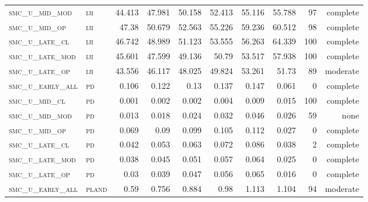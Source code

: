 \begin{landscape}
\begin{center}
\begin{footnotesize}
\begin{longtable}{llrrrrr|rrr}
\textsc{smc\_u\_mid\_mod  } & \textsc{iji       }   & 44.413   & 47.981   & 50.158   & 52.413   & 55.116   & 55.788        & 97            & complete        \\
\textsc{smc\_u\_mid\_op   } & \textsc{iji       }   & 47.38    & 50.679   & 52.563   & 55.226   & 59.236   & 60.512        & 98            & complete        \\
\textsc{smc\_u\_late\_cl  } & \textsc{iji       }   & 46.742   & 48.989   & 51.123   & 53.555   & 56.263   & 64.339        & 100           & complete        \\
\textsc{smc\_u\_late\_mod } & \textsc{iji       }   & 45.601   & 47.599   & 49.136   & 50.79    & 53.517   & 57.938        & 100           & complete        \\
\textsc{smc\_u\_late\_op  } & \textsc{iji       }   & 43.556   & 46.117   & 48.025   & 49.824   & 53.261   & 51.73         & 89            & moderate        \\
\textsc{smc\_u\_early\_all} & \textsc{pd        }   & 0.106    & 0.122    & 0.13     & 0.137    & 0.147    & 0.061         & 0             & complete            \\
\textsc{smc\_u\_mid\_cl   } & \textsc{pd        }   & 0.001    & 0.002    & 0.002    & 0.004    & 0.009    & 0.015         & 100           & complete        \\
\textsc{smc\_u\_mid\_mod  } & \textsc{pd        }   & 0.013    & 0.018    & 0.024    & 0.032    & 0.046    & 0.026         & 59            & none        \\
\textsc{smc\_u\_mid\_op   } & \textsc{pd        }   & 0.069    & 0.09     & 0.099    & 0.105    & 0.112    & 0.027         & 0             & complete            \\
\textsc{smc\_u\_late\_cl  } & \textsc{pd        }   & 0.042    & 0.053    & 0.063    & 0.072    & 0.086    & 0.038         & 2             & complete        \\
\textsc{smc\_u\_late\_mod } & \textsc{pd        }   & 0.038    & 0.045    & 0.051    & 0.057    & 0.064    & 0.025         & 0             & complete            \\
\textsc{smc\_u\_late\_op  } & \textsc{pd        }   & 0.03     & 0.039    & 0.047    & 0.056    & 0.065    & 0.016         & 0             & complete            \\
\textsc{smc\_u\_early\_all} & \textsc{pland     }   & 0.59     & 0.756    & 0.884    & 0.98     & 1.113    & 1.104         & 94            & moderate        \\

\end{longtable}
\end{footnotesize}
\end{center}
\end{landscape}
